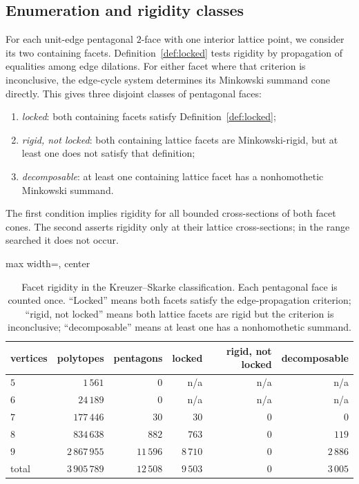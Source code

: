 \documentclass[11pt]{amsart}
\theoremstyle{definition}
\theoremstyle{remark}
\theoremstyle{plain}
\begin{document}
\subsection{Enumeration and rigidity classes}
For each unit-edge pentagonal $2$-face with one interior lattice point,
we consider its two containing facets.  Definition~\ref{def:locked}
tests rigidity by propagation of equalities among edge dilations.
For either facet where that criterion is inconclusive, the
edge-cycle system determines its Minkowski summand cone directly.
This gives three disjoint classes of pentagonal faces:
\begin{enumerate}
\item \emph{locked}: both containing facets satisfy
Definition~\ref{def:locked};
\item \emph{rigid, not locked}: both containing lattice facets are
Minkowski-rigid, but at least one does not satisfy that definition;
\item \emph{decomposable}: at least one containing lattice facet has
a nonhomothetic Minkowski summand.
\end{enumerate}
The first condition implies rigidity for all bounded cross-sections
of both facet cones.  The second asserts rigidity only at their
lattice cross-sections; in the range searched it does not occur.

\begin{table}[ht]
\caption{Facet rigidity in the Kreuzer--Skarke classification.
Each pentagonal face is counted once.  ``Locked'' means both facets
satisfy the edge-propagation criterion; ``rigid, not locked'' means
both lattice facets are rigid but the criterion is inconclusive;
``decomposable'' means at least one has a nonhomothetic summand.}\label{tab:census}
\centering
\begin{adjustbox}{max width=\textwidth, center}
\begin{tabular}{lrrrrr}
\toprule
vertices & polytopes & pentagons & locked & rigid, not locked & decomposable \\
\midrule
$5$ & $1\,561$ & $0$ & n/a & n/a & n/a \\
$6$ & $24\,189$ & $0$ & n/a & n/a & n/a \\
$7$ & $177\,446$ & $30$ & $30$ & $0$ & $0$ \\
$8$ & $834\,638$ & $882$ & $763$ & $0$ & $119$ \\
$9$ & $2\,867\,955$ & $11\,596$ & $8\,710$ & $0$ & $2\,886$ \\
\midrule
total & $3\,905\,789$ & $12\,508$ & $9\,503$ & $0$ & $3\,005$ \\
\bottomrule
\end{tabular}
\end{adjustbox}
\end{table}
\end{document}
